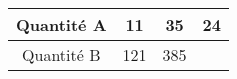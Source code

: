 \begin{tabular}{|c|c|c|c|}
\hline
Quantité A & 11 & 35 & 24 \\ \hline
Quantité B & 121 & 385 & \kern1cm \\ \hline
\end{tabular}

